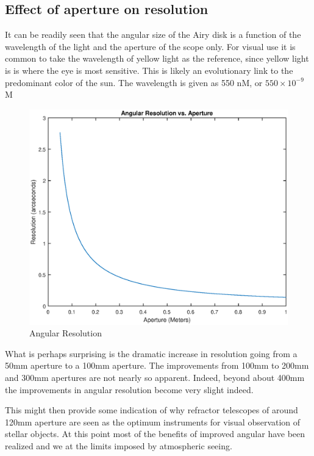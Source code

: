 \documentclass[11pt]{article}
\begin{document}
\subsection{Effect of aperture on resolution}

It can be readily seen that the angular size of the Airy disk is a function of the wavelength of the light and the aperture of the scope only.  For visual use it is common to take the wavelength of yellow light as the reference, since yellow light is is where the eye is most sensitive.  This is likely an evolutionary link to the predominant color of the sun.  The wavelength is given as 550 nM, or $550\times 10^{-9}$ M 

\bigskip
\begin{figure}[htb]
	\begin{center}
		\includegraphics[scale=0.7]{./images/resolution.eps}
		\caption{Angular Resolution}
		\label{fig:resolution}
	\end{center}
\end{figure}

What is perhaps surprising is the dramatic increase in resolution going from a 50mm aperture to a 100mm aperture. The improvements from 100mm to 200mm and 300mm apertures are not nearly so apparent.  Indeed, beyond about 400mm the improvements in angular resolution become very slight indeed.

This might then provide some indication of why refractor telescopes of around 120mm aperture are seen as the optimum instruments for visual observation of stellar objects.  At this point most of the benefits of improved angular have been realized and we at the  limits imposed by atmospheric seeing.
\end{document}
